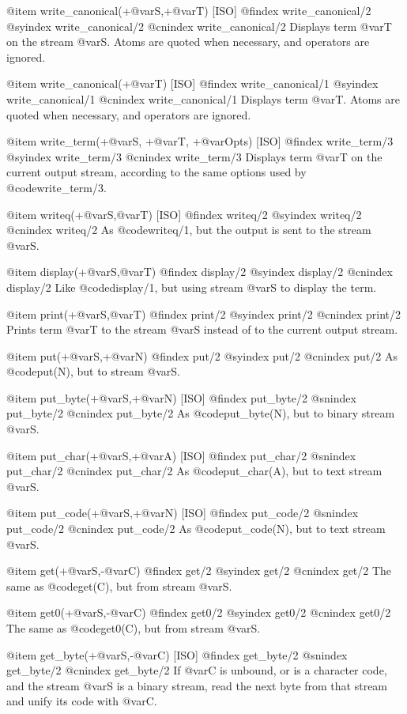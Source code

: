 {{{{{{@item write_canonical(+@var{S},+@var{T}) [ISO]
@findex write_canonical/2
@syindex write_canonical/2
@cnindex write_canonical/2
Displays term @var{T} on the stream @var{S}. Atoms are quoted when
necessary, and operators are ignored.

@item write_canonical(+@var{T}) [ISO]
@findex write_canonical/1
@syindex write_canonical/1
@cnindex write_canonical/1
Displays term @var{T}. Atoms are quoted when necessary, and operators
are ignored.

@item write_term(+@var{S}, +@var{T}, +@var{Opts}) [ISO]
@findex write_term/3
@syindex write_term/3
@cnindex write_term/3
Displays term @var{T} on the current output stream, according to the same
options used by @code{write_term/3}.

@item writeq(+@var{S},@var{T}) [ISO]
@findex writeq/2
@syindex writeq/2
@cnindex writeq/2
As @code{writeq/1}, but the output is sent to the stream @var{S}.

@item display(+@var{S},@var{T})
@findex display/2
@syindex display/2
@cnindex display/2
Like @code{display/1}, but using stream @var{S} to display the term.

@item print(+@var{S},@var{T})
@findex print/2
@syindex print/2
@cnindex print/2
Prints term @var{T} to the stream @var{S} instead of to the current output
stream.

@item put(+@var{S},+@var{N})
@findex put/2
@syindex put/2
@cnindex put/2
As @code{put(N)}, but to stream @var{S}.

@item put_byte(+@var{S},+@var{N}) [ISO]
@findex put_byte/2
@snindex put_byte/2
@cnindex put_byte/2
As @code{put_byte(N)}, but to binary stream @var{S}.

@item put_char(+@var{S},+@var{A}) [ISO]
@findex put_char/2
@snindex put_char/2
@cnindex put_char/2
As @code{put_char(A)}, but to text stream @var{S}.

@item put_code(+@var{S},+@var{N}) [ISO]
@findex put_code/2
@snindex put_code/2
@cnindex put_code/2
As @code{put_code(N)}, but to text stream @var{S}.

@item get(+@var{S},-@var{C})
@findex get/2
@syindex get/2
@cnindex get/2
The same as @code{get(C)}, but from stream @var{S}.

@item get0(+@var{S},-@var{C})
@findex get0/2
@syindex get0/2
@cnindex get0/2
The same as @code{get0(C)}, but from stream @var{S}.

@item get_byte(+@var{S},-@var{C}) [ISO]
@findex get_byte/2
@snindex get_byte/2
@cnindex get_byte/2
If @var{C} is unbound, or is a character code, and the stream @var{S} is a
binary stream, read the next byte from that stream and unify its
code with @var{C}.

}}}}}}
